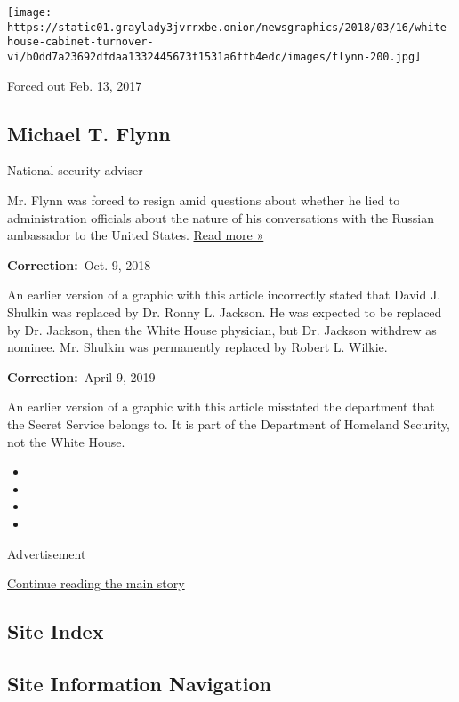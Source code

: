 \texttt{[image: https://static01.graylady3jvrrxbe.onion/newsgraphics/2018/03/16/white-house-cabinet-turnover-vi/b0dd7a23692dfdaa1332445673f1531a6ffb4edc/images/flynn-200.jpg]}

Forced out Feb. 13, 2017

\hypertarget{michael-t-flynn}{%
\subsection{Michael T. Flynn}\label{michael-t-flynn}}

National security adviser

Mr. Flynn was forced to resign amid questions about whether he lied to
administration officials about the nature of his conversations with the
Russian ambassador to the United States.
\href{https://www.nytimes3xbfgragh.onion/2017/02/13/us/politics/donald-trump-national-security-adviser-michael-flynn.html}{Read
more »}

\textbf{Correction:}~Oct. 9, 2018

An earlier version of a graphic with this article incorrectly stated
that David J. Shulkin was replaced by Dr. Ronny L. Jackson. He was
expected to be replaced by Dr. Jackson, then the White House physician,
but Dr. Jackson withdrew as nominee. Mr. Shulkin was permanently
replaced by Robert L. Wilkie.

\textbf{Correction:}~April 9, 2019

An earlier version of a graphic with this article misstated the
department that the Secret Service belongs to. It is part of the
Department of Homeland Security, not the White House.

\begin{itemize}
\item
\item
\item
\item
\end{itemize}

Advertisement

\protect\hyperlink{after-bottom}{Continue reading the main story}

\hypertarget{site-index}{%
\subsection{Site Index}\label{site-index}}

\hypertarget{site-information-navigation}{%
\subsection{Site Information
Navigation}\label{site-information-navigation}}


